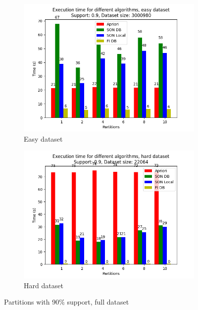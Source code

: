 \documentclass[a4paper]{article}
\begin{document}
	\begin{figure}[h]
		\centering
		\begin{subfigure}[b]{\textwidth}
			\centering
			\includegraphics[width=\textwidth]{1_easy_0,9_1_partitions.png}
         	\caption{Easy dataset}
		\end{subfigure}
		\hfill		
		\begin{subfigure}[b]{\textwidth}
			\centering
			\includegraphics[width=\textwidth]{1_hard_0,9_1_partitions.png}
         	\caption{Hard dataset}
		\end{subfigure}
		\hfill
		
		\caption{Partitions with 90\% support, full dataset}
		\label{fig:09sup}
	\end{figure}
\end{document}
